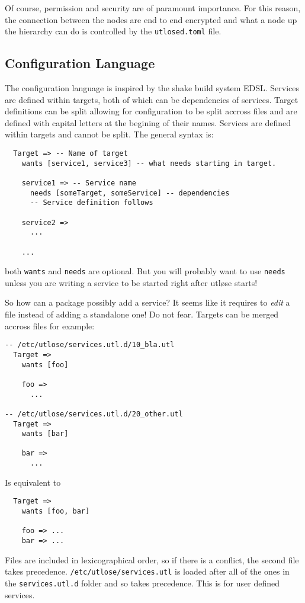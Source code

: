 \documentclass{article}
\begin{document}
Of course, permission and security are of paramount importance. For this reason, the connection between the nodes are end to end
encrypted and what a node up the hierarchy can do is controlled by the \texttt{utlosed.toml} file.

\subsection{Configuration Language}
The configuration language is inspired by the shake build system EDSL. Services are defined within targets, both of which
can be dependencies of services. Target definitions can be split allowing for configuration to be split accross files and
are defined with capital letters at the begining of their names. Services are defined within targets and cannot be split.
The general syntax is:

\begin{verbatim}
  Target => -- Name of target
    wants [service1, service3] -- what needs starting in target.

    service1 => -- Service name
      needs [someTarget, someService] -- dependencies
      -- Service definition follows

    service2 =>
      ...

    ...
\end{verbatim}
both \texttt{wants} and \texttt{needs} are optional. But you will probably want to use \texttt{needs}
unless you are writing a service to be started right after utløse starts!

So how can a package possibly add a service? It seems like it requires to \textit{edit} a file
instead of adding a standalone one! Do not fear. Targets can be merged accross files for example:

\begin{verbatim}
-- /etc/utlose/services.utl.d/10_bla.utl
  Target =>
    wants [foo]

    foo => 
      ...

-- /etc/utlose/services.utl.d/20_other.utl
  Target =>
    wants [bar]

    bar => 
      ...

\end{verbatim}
Is equivalent to
\begin{verbatim}
  Target =>
    wants [foo, bar]

    foo => ...
    bar => ...
\end{verbatim}
Files are included in lexicographical order, so if there is a conflict, the second file takes precedence.
\texttt{/etc/utlose/services.utl} is loaded after all of the ones in the \texttt{services.utl.d} folder
and so takes precedence. This is for user defined services.
\end{document}
